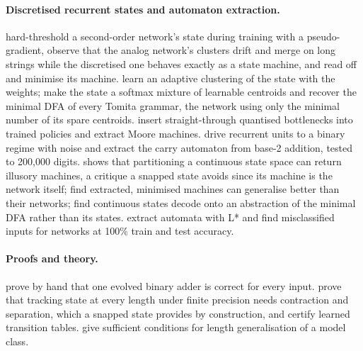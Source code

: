 \documentclass[11pt]{article}
\begin{document}
\paragraph{Discretised recurrent states and automaton extraction.}
\citet{zeng-1993-self-clustering-recurrent-networks} hard-threshold a second-order network's state
during training with a pseudo-gradient, observe that the analog network's clusters drift and merge
on long strings while the discretised one behaves exactly as a state machine, and read off and
minimise its machine. \citet{das-1993-unified-gradient-clustering-fsm-induction} learn an adaptive
clustering of the state with the weights; \citet{wang-2019-state-regularized-rnns} make the state a
softmax mixture of learnable centroids and recover the minimal DFA of every Tomita grammar, the
network using only the minimal number of its spare centroids. \citet{koul-2019-finite-state-recurrent-policies}
insert straight-through quantised bottlenecks into trained policies and extract Moore machines.
\citet{oliva-2020-dual-recurrent-memory-processing} drive recurrent units to a binary regime with
noise and extract the carry automaton from base-2 addition, tested to 200{,}000 digits.
\citet{kolen-1993-fools-gold-extracting-fsm} shows that partitioning a continuous state space can
return illusory machines, a critique a snapped state avoids since its machine is the network
itself; \citet{omlin-1996-extraction-rules-discrete-time-rnn} find extracted, minimised machines
can generalise better than their networks; \citet{michalenko-2019-representing-formal-languages-fa-rnn}
find continuous states decode onto an abstraction of the minimal DFA rather than its states.
\citet{weiss-2018-extracting-automata-queries-counterexamples} extract automata with L* and find
misclassified inputs for networks at 100\% train and test accuracy.

\paragraph{Proofs and theory.} \citet{lan-2022-minimum-description-length-rnns} prove by hand that
one evolved binary adder is correct for every input. \citet{brandoit-2026-length-independent-state-tracking}
prove that tracking state at every length under finite precision needs contraction and separation,
which a snapped state provides by construction, and certify learned transition tables.
\citet{ahuja-2024-provable-length-compositional-generalization} give sufficient conditions for length
generalisation of a model class.
\end{document}
